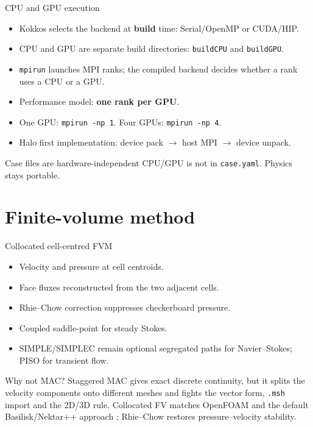 \documentclass[aspectratio=169,10pt]{beamer}
\begin{document}
\begin{frame}{CPU and GPU execution}
  \begin{itemize}
    \item Kokkos selects the backend at \textbf{build} time:
          Serial/OpenMP or CUDA/HIP.
    \item CPU and GPU are separate build directories:
          \texttt{buildCPU} and \texttt{buildGPU}.
    \item \texttt{mpirun} launches MPI ranks; the compiled backend decides
          whether a rank uses a CPU or a GPU.
    \item Performance model: \textbf{one rank per GPU}.
    \item One GPU: \texttt{mpirun -np 1}. Four GPUs:
          \texttt{mpirun -np 4}.
    \item Halo first implementation: device pack $\rightarrow$ host MPI
          $\rightarrow$ device unpack.
  \end{itemize}

  \begin{block}{Case files are hardware-independent}
    CPU/GPU is not in \texttt{case.yaml}. Physics stays portable.
  \end{block}
\end{frame}

\section{Finite-volume method}

\begin{frame}{Collocated cell-centred FVM}
  \begin{itemize}
    \item Velocity and pressure at cell centroids.
    \item Face fluxes reconstructed from the two adjacent cells.
    \item Rhie--Chow correction suppresses checkerboard pressure.
    \item Coupled saddle-point \cite{benzi2005,elman2014} for steady Stokes.
    \item SIMPLE/SIMPLEC remain optional segregated paths for Navier--Stokes;
          PISO for transient flow.
  \end{itemize}

  \begin{block}{Why not MAC?}
    Staggered MAC gives exact discrete continuity, but it splits the velocity
    components onto different meshes and fights the vector form, \texttt{.msh}
    import and the 2D/3D rule. Collocated FV matches OpenFOAM and the default
    Basilisk/Nektar++ approach \cite{weller1998,cantwell2015}; Rhie--Chow
    \cite{rhieChow1983} restores pressure--velocity stability.
  \end{block}
\end{frame}
\end{document}
